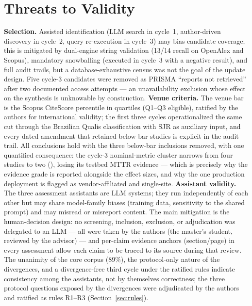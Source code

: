 \documentclass{ieeeaccess}
\begin{document}
\section{Threats to Validity}
\label{sec:threats}

\textbf{Selection.} Assisted identification (LLM search in cycle~1,
author-driven discovery in cycle~2, query re-execution in cycle~3) may
bias candidate coverage; this is mitigated by dual-engine string
validation (13/14 recall on OpenAlex and Scopus), mandatory snowballing
(executed in cycle~3 with a negative result), and full audit trails, but
a database-exhaustive census was not the goal of the update design. Five
cycle-3 candidates were removed as PRISMA ``reports not retrieved''
after two documented access attempts --- an unavailability exclusion
whose effect on the synthesis is unknowable by construction.
\textbf{Venue criteria.} The venue bar is the Scopus CiteScore
percentile in quartiles (Q1--Q3 eligible), ratified by the authors
for international validity; the first three cycles
operationalized the same cut through the Brazilian Qualis
classification with SJR as auxiliary input, and every dated amendment
that retained below-bar studies is explicit in the audit trail. All
conclusions hold with the three below-bar inclusions removed, with one
quantified consequence: the cycle-3 nominal-metric cluster narrows from
four studies to two (\cite{P100,P123}), losing its testbed MTTR
evidence --- which is precisely why the evidence grade is reported
alongside the effect sizes, and why the one production deployment is
flagged as vendor-affiliated and single-site.
\textbf{Assistant validity.} The three assessment assistants are LLM
systems; they run independently of each other but may share
model-family biases (training data, sensitivity to the shared prompt)
and may misread or misreport content. The main mitigation is the
human-decision design: no screening, inclusion, exclusion, or
adjudication was delegated to an LLM --- all were taken by the authors
(the master's student, reviewed by the advisor) --- and per-claim
evidence anchors (section/page) in every assessment allow each claim
to be traced to its source during that review. The unanimity of the
core corpus (89\%), the protocol-only nature of the divergences, and a
divergence-free third cycle under the ratified rules indicate
consistency among the assistants, not by themselves correctness; the
three protocol questions exposed by the divergences were adjudicated
by the authors and ratified as rules R1--R3 (Section~\ref{sec:rules}).
\end{document}
